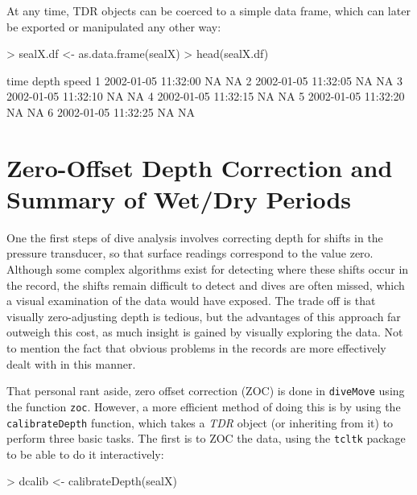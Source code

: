 \documentclass[12pt, letterpaper]{scrartcl}
\newcommand{\Rfunction}[1]{{\texttt{#1}}}
\newcommand{\Rpackage}[1]{{\texttt{#1}}}
\newcommand{\Rclass}[1]{{\textit{#1}}}
\begin{document}
At any time, TDR objects can be coerced to a simple data frame, which can
later be exported or manipulated any other way:
\begin{Schunk}
\begin{Sinput}
> sealX.df <- as.data.frame(sealX)
> head(sealX.df)
\end{Sinput}
\begin{Soutput}
                 time depth speed
1 2002-01-05 11:32:00    NA    NA
2 2002-01-05 11:32:05    NA    NA
3 2002-01-05 11:32:10    NA    NA
4 2002-01-05 11:32:15    NA    NA
5 2002-01-05 11:32:20    NA    NA
6 2002-01-05 11:32:25    NA    NA
\end{Soutput}
\end{Schunk}


\section[ZOC and Wet/Dry period detection]{Zero-Offset Depth Correction
  and Summary of Wet/Dry Periods}
\label{sec:zoc}

One the first steps of dive analysis involves correcting depth for shifts
in the pressure transducer, so that surface readings correspond to the
value zero.  Although some complex algorithms exist for detecting where
these shifts occur in the record, the shifts remain difficult to detect
and dives are often missed, which a visual examination of the data would
have exposed.  The trade off is that visually zero-adjusting depth is
tedious, but the advantages of this approach far outweigh this cost, as
much insight is gained by visually exploring the data.  Not to mention the
fact that obvious problems in the records are more effectively dealt with
in this manner.

That personal rant aside, zero offset correction (ZOC) is done in
\Rpackage{diveMove} using the function \Rfunction{zoc}.  However, a more
efficient method of doing this is by using the \Rfunction{calibrateDepth}
function, which takes a \Rclass{TDR} object (or inheriting from it) to
perform three basic tasks.  The first is to ZOC the data, using the
\Rpackage{tcltk} package to be able to do it interactively:
\begin{Schunk}
\begin{Sinput}
> dcalib <- calibrateDepth(sealX)
\end{Sinput}
\end{Schunk}
\end{document}

